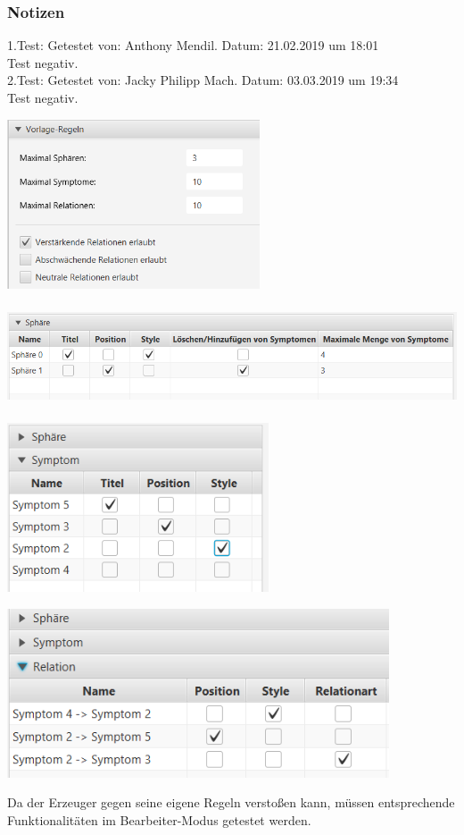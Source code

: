 \documentclass[enabledeprecatedfontcommands]{scrartcl}
\begin{document}
\subsubsection{Notizen}
1.Test: Getestet von: Anthony Mendil. Datum: 21.02.2019 um 18:01 \\
Test negativ. \\
2.Test: Getestet von: Jacky Philipp Mach. Datum: 03.03.2019 um 19:34 \\
Test negativ.
\begin{center}
\includegraphics[height=5cm]{template4.PNG}
\end{center}
\begin{center}
\includegraphics[height=3cm]{template1.PNG}
\end{center}
\begin{center}
\includegraphics[height=5cm]{template2.PNG}
\end{center}
\begin{center}
\includegraphics[height=5cm]{template3.PNG}
\end{center}
Da der Erzeuger gegen seine eigene Regeln verstoßen kann, müssen entsprechende Funktionalitäten im Bearbeiter-Modus getestet werden.
\end{document}
